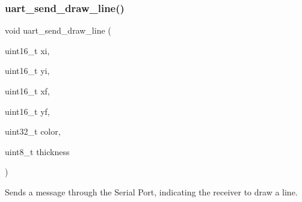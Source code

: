 \subsubsection{\texorpdfstring{uart\+\_\+send\+\_\+draw\+\_\+line()}{uart\_send\_draw\_line()}}
{\footnotesize\ttfamily void uart\+\_\+send\+\_\+draw\+\_\+line (\begin{DoxyParamCaption}\item[{uint16\+\_\+t}]{xi,  }\item[{uint16\+\_\+t}]{yi,  }\item[{uint16\+\_\+t}]{xf,  }\item[{uint16\+\_\+t}]{yf,  }\item[{uint32\+\_\+t}]{color,  }\item[{uint8\+\_\+t}]{thickness }\end{DoxyParamCaption})}



Sends a message through the Serial Port, indicating the receiver to draw a line. 


